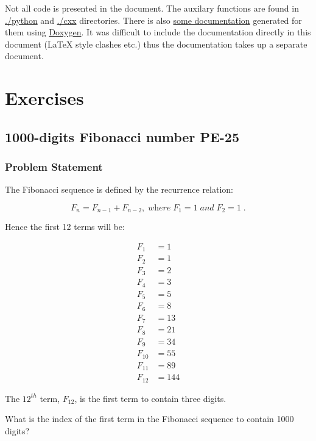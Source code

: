 \documentclass[11pt]{article}
\begin{document}
Not all code is presented in the document.  The auxilary functions are found
in \url{./python} and \url{./cxx} directories.  There is also \href{latex/refman.pdf}{some documentation} generated
for them using \href{http://www.stack.nl/~dimitri/doxygen/}{Doxygen}. It was difficult to include the documentation directly
in this document (\LaTeX{} style clashes etc.) thus the documentation takes up a
separate document.

\section{Exercises}
\label{sec:orgheadline21}
\subsection{1000-digits Fibonacci number PE-25}
\label{sec:orgheadline5}
\subsubsection{Problem Statement}
\label{sec:orgheadline2}
The Fibonacci sequence is defined by the recurrence relation:

\begin{equation*}
  F_n = F_{n-1} + F_{n-2},\; \textit{where}\; F_1 = 1\; \textit{and} \; F_2 = 1\;.
\end{equation*}


Hence the first 12 terms will be:

\begin{align*}
  F_1    &= 1   \\
  F_2    &= 1   \\
  F_3    &= 2   \\
  F_4    &= 3   \\
  F_5    &= 5   \\
  F_6    &= 8   \\
  F_7    &= 13  \\
  F_8    &= 21  \\
  F_9    &= 34  \\
  F_{10} &= 55  \\
  F_{11} &= 89  \\
  F_{12} &= 144
\end{align*}


The \(12^{th}\) term, \(F_{12}\), is the first term to contain three digits.

What is the index of the first term in the Fibonacci sequence 
to contain 1000 digits?
\end{document}
